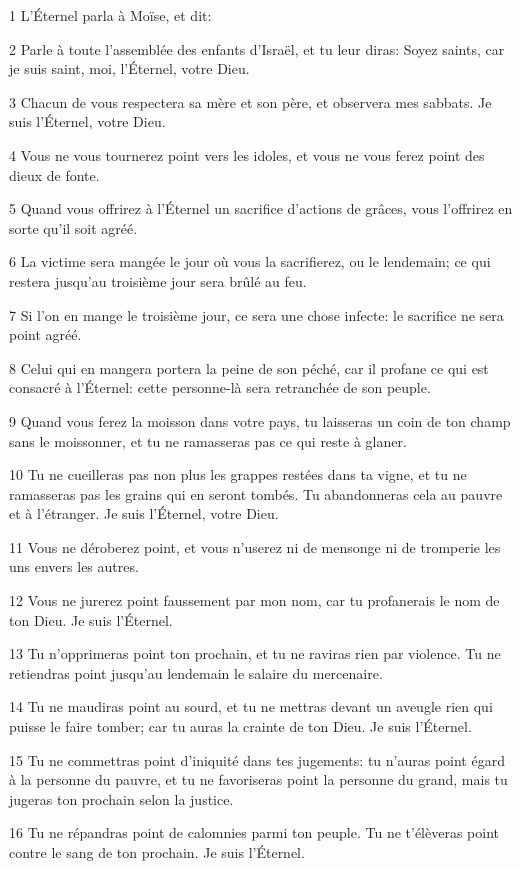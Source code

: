 \par 1 L'Éternel parla à Moïse, et dit:
\par 2 Parle à toute l'assemblée des enfants d'Israël, et tu leur diras: Soyez saints, car je suis saint, moi, l'Éternel, votre Dieu.
\par 3 Chacun de vous respectera sa mère et son père, et observera mes sabbats. Je suis l'Éternel, votre Dieu.
\par 4 Vous ne vous tournerez point vers les idoles, et vous ne vous ferez point des dieux de fonte.
\par 5 Quand vous offrirez à l'Éternel un sacrifice d'actions de grâces, vous l'offrirez en sorte qu'il soit agréé.
\par 6 La victime sera mangée le jour où vous la sacrifierez, ou le lendemain; ce qui restera jusqu'au troisième jour sera brûlé au feu.
\par 7 Si l'on en mange le troisième jour, ce sera une chose infecte: le sacrifice ne sera point agréé.
\par 8 Celui qui en mangera portera la peine de son péché, car il profane ce qui est consacré à l'Éternel: cette personne-là sera retranchée de son peuple.
\par 9 Quand vous ferez la moisson dans votre pays, tu laisseras un coin de ton champ sans le moissonner, et tu ne ramasseras pas ce qui reste à glaner.
\par 10 Tu ne cueilleras pas non plus les grappes restées dans ta vigne, et tu ne ramasseras pas les grains qui en seront tombés. Tu abandonneras cela au pauvre et à l'étranger. Je suis l'Éternel, votre Dieu.
\par 11 Vous ne déroberez point, et vous n'userez ni de mensonge ni de tromperie les uns envers les autres.
\par 12 Vous ne jurerez point faussement par mon nom, car tu profanerais le nom de ton Dieu. Je suis l'Éternel.
\par 13 Tu n'opprimeras point ton prochain, et tu ne raviras rien par violence. Tu ne retiendras point jusqu'au lendemain le salaire du mercenaire.
\par 14 Tu ne maudiras point au sourd, et tu ne mettras devant un aveugle rien qui puisse le faire tomber; car tu auras la crainte de ton Dieu. Je suis l'Éternel.
\par 15 Tu ne commettras point d'iniquité dans tes jugements: tu n'auras point égard à la personne du pauvre, et tu ne favoriseras point la personne du grand, mais tu jugeras ton prochain selon la justice.
\par 16 Tu ne répandras point de calomnies parmi ton peuple. Tu ne t'élèveras point contre le sang de ton prochain. Je suis l'Éternel.

